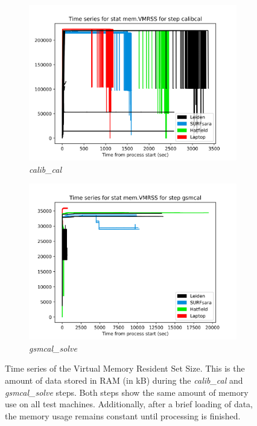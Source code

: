 \begin{figure}
  \centering
   \begin{subfigure}{.45\textwidth}
    \includegraphics[width=\textwidth]{ch4/figures/fig10/calibcal_vmrss.png}
      \caption{\textit{calib\_cal} }
	\label{fig:ch4_calib_cal_VMRSS}
 \end{subfigure}%
 \begin{subfigure}{.45\textwidth}
    \includegraphics[width=\textwidth]{ch4/figures/fig10/gsmcal_vmrss.png}
      \caption{\textit{gsmcal\_solve}}
	\label{fig:ch4_fitclock_VMRSS}
 \end{subfigure}
    \caption[Time series of the Virtual Memory Resident Set Size]{Time series of the Virtual Memory Resident Set Size. This is the amount of data stored in RAM (in kB) during the \textit{calib\_cal} and \textit{gsmcal\_solve} steps. Both steps show the same amount of memory use on all test machines. Additionally, after a brief loading of data, the memory usage remains constant until processing is finished. }
 \label{fig:ch4_VMRSS}
\end{figure}

